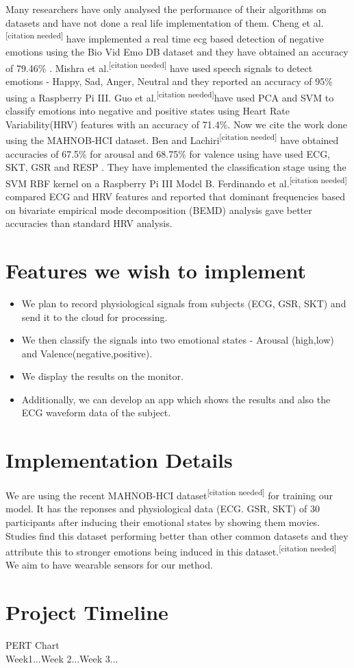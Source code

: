 \documentclass[11pt]{article}
\theoremstyle{definition}
\begin{document}
Many researchers have only analysed the performance of their algorithms on datasets and have not done a real life implementation of them.
Cheng et al.\textsuperscript{[citation needed]} have implemented a real time ecg based detection of negative emotions using the Bio Vid Emo DB dataset and they have obtained an accuracy of 79.46\% . 
Mishra et al.\textsuperscript{[citation needed]} have used speech signals to detect emotions - Happy, Sad, Anger, Neutral and they reported an accuracy of 95\% using a Raspberry Pi III.
Guo et al.\textsuperscript{[citation needed]}have used PCA and SVM to classify emotions into negative and positive states using Heart Rate Variability(HRV) features with an accuracy of 71.4\%.
Now we cite the work done using the MAHNOB-HCI dataset. 
Ben and Lachiri\textsuperscript{[citation needed]} have obtained accuracies of 67.5\% for arousal and 68.75\% for valence using have used ECG, SKT, GSR and RESP . They have implemented the classification stage using the SVM RBF kernel on a Raspberry Pi III Model B.
Ferdinando et al.\textsuperscript{[citation needed]} compared ECG and HRV features and reported that dominant frequencies based on
 bivariate empirical mode decomposition (BEMD) analysis gave better accuracies than standard HRV analysis.
   

  \section{Features we wish to implement}


\begin{itemize}
	\item We plan to record physiological signals from subjects (ECG, GSR, SKT) and send it to the cloud for processing.
	\item We then classify the signals into two emotional states - Arousal (high,low) and Valence(negative,positive).
	\item We display the results on the monitor.
	\item Additionally, we can develop an app which shows the results and also the ECG waveform data of the subject.
\end{itemize}


  \section{Implementation Details}

We are using the recent MAHNOB-HCI dataset\textsuperscript{[citation needed]} for training our model. It has the reponses and physiological data (ECG. GSR, SKT) of 30 participants after inducing their emotional states by showing them movies. Studies find this dataset performing better than other common datasets and they attribute this to stronger emotions being induced in this dataset.\textsuperscript{[citation needed]}\\
We aim to have wearable sensors for our method.

  \section{Project Timeline}
PERT Chart\\
Week1...Week 2...Week 3...
  
\end{document}
